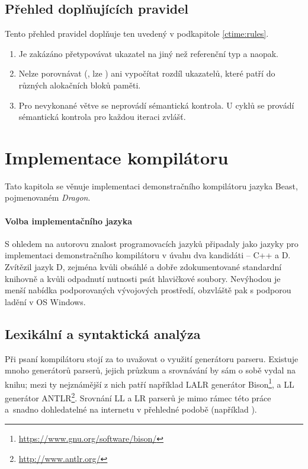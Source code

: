 \section{Přehled doplňujících pravidel} \label{ctime:moreRules}
Tento přehled pravidel doplňuje ten uvedený v podkapitole \ref{ctime:rules}.

\begin{enumerate}
	\item Je zakázáno přetypovávat \ctime ukazatel na jiný než referenční \ctime typ a naopak.
	\item Nelze porovnávat (\inlineCode{< > <= >=}, lze ) ani vypočítat rozdíl \ctime ukazatelů, které patří do různých alokačních bloků paměti.
	\item Pro nevykonané \ctime větve se neprovádí sémantická kontrola. U \ctime cyklů se provádí sémantická kontrola pro každou iteraci zvlášť.
\end{enumerate}

\chapter{Implementace kompilátoru} \label{chap:compiler}
Tato kapitola se věnuje implementaci demonstračního kompilátoru jazyka Beast, pojmenovaném \textit{Dragon}.

\subsubsection{Volba implementačního jazyka}
S ohledem na autorovu znalost programovacích jazyků připadaly jako jazyky pro implementaci demonstračního kompilátoru v úvahu dva kandidáti -- C++ a D. Zvítězil jazyk D, zejména kvůli obsáhlé a dobře zdokumentované standardní knihovně a kvůli odpadnutí nutnosti psát hlavičkové soubory. Nevýhodou je menší nabídka podporovaných vývojových prostředí, obzvláště pak s podporou ladění v OS Windows.

\section{Lexikální a syntaktická analýza}
Při psaní kompilátoru stojí za to uvažovat o využití generátoru parseru. Existuje mnoho generátorů parserů, jejich průzkum a srovnávání by sám o sobě vydal na knihu; mezi ty nejznámější z nich patří například LALR generátor Bison\footnote{\url{https://www.gnu.org/software/bison/}}, a LL generátor ANTLR\footnote{\url{http://www.antlr.org/}}. Srovnání LL a LR parserů je mimo rámec této práce a~snadno dohledatelné na internetu v přehledné podobě (například \cite{LLLRComp}).

